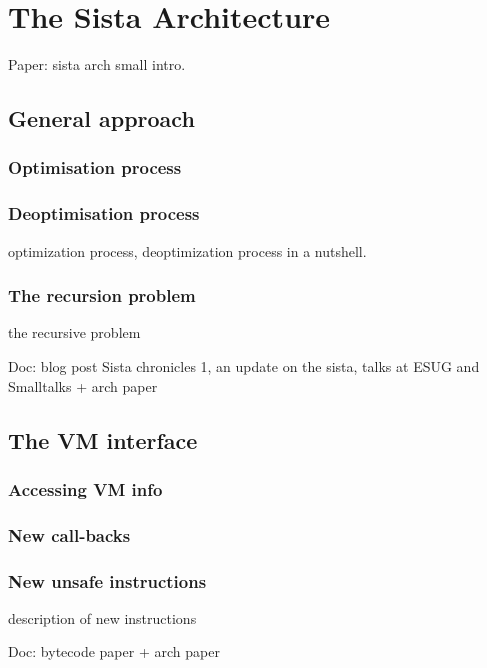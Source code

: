 \documentclass[a4paper,12pt,twoside]{../includes/ThesisStyle}
\begin{document}
\fi

\chapter{The Sista Architecture}
\label{chap:archTheory}
\minitoc

Paper: sista arch
small intro. 

\section{General approach}

\subsection {Optimisation process}


\subsection {Deoptimisation process}
optimization process, deoptimization process in a nutshell.

\subsection{The recursion problem}

the recursive problem

Doc: blog post Sista chronicles 1, an update on the sista, talks at ESUG and Smalltalks + arch paper

\section{The VM interface}

\subsection{Accessing VM info}

\subsection{New call-backs}

\subsection{New unsafe instructions}

description of new instructions


Doc: bytecode paper + arch paper
\end{document}
